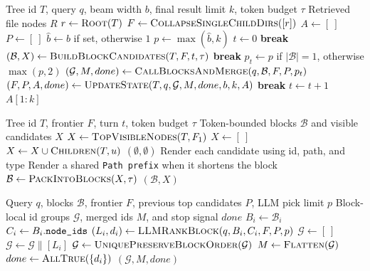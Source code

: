 \documentclass{article}
\begin{document}
\begin{algorithm}[H]
\caption{FilesystemBlock Main Loop}
\begin{algorithmic}[1]
\Require Tree id $T$, query $q$, beam width $b$, final result limit $k$, token budget $\tau$
\Ensure Retrieved file nodes $R$
\State $r \gets \Call{Root}{T}$
\State $F \gets \Call{CollapseSingleChildDirs}{[r]}$
\State $A \gets [\ ]$
\State $P \gets [\ ]$
\State $\hat b \gets b$ if set, otherwise $1$
\State $p \gets \max(\hat b,k)$ 
\State $t \gets 0$
    \State \textbf{break}
  \EndIf
  \State $(\mathcal{B}, X) \gets \Call{BuildBlockCandidates}{T,F,t,\tau}$
    \State \textbf{break}
  \EndIf
  \State $p_t \gets p$ if $|\mathcal{B}|=1$, otherwise $\max(p,2)$
  \State $(\mathcal{G}, M, done) \gets \Call{CallBlocksAndMerge}{q,\mathcal{B},F,P,p_t}$
  \State $(F,P,A,done) \gets \Call{UpdateState}{T,q,\mathcal{G},M,done,b,k,A}$
    \State \textbf{break}
  \EndIf
  \State $t \gets t + 1$
\EndWhile
\State \Return $A[1:k]$
\end{algorithmic}
\end{algorithm}

\begin{algorithm}[H]
\caption{BuildBlockCandidates}
\begin{algorithmic}[1]
\Require Tree id $T$, frontier $F$, turn $t$, token budget $\tau$
\Ensure Token-bounded blocks $\mathcal{B}$ and visible candidates $X$
  \State $X \gets \Call{TopVisibleNodes}{T,F_1}$
\Else
  \State $X \gets [\ ]$
    \State $X \gets X \cup \Call{Children}{T,u}$
  \EndFor
\EndIf
{}
  \State \Return $(\emptyset,\emptyset)$
\EndIf
\State Render each candidate using id, path, and type
\State Render a shared \texttt{Path prefix} when it shortens the block
\State $\mathcal{B} \gets \Call{PackIntoBlocks}{X,\tau}$
\State \Return $(\mathcal{B},X)$
\end{algorithmic}
\end{algorithm}

\begin{algorithm}[H]
\caption{CallBlocksAndMerge}
\begin{algorithmic}[1]
\Require Query $q$, blocks $\mathcal{B}$, frontier $F$, previous top candidates $P$, LLM pick limit $p$
\Ensure Block-local id groups $\mathcal{G}$, merged ids $M$, and stop signal $done$
  \State $B_i \gets \mathcal{B}_i$
  \State $C_i \gets B_i.\text{\texttt{node\_ids}}$
  \State $(L_i,d_i) \gets \Call{LLMRankBlock}{q,B_i,C_i,F,P,p}$
\EndFor
\State $\mathcal{G} \gets [\ ]$
  \State $\mathcal{G} \gets \mathcal{G} \parallel [L_i]$
\EndFor
\State $\mathcal{G} \gets \Call{UniquePreserveBlockOrder}{\mathcal{G}}$
\State $M \gets \Call{Flatten}{\mathcal{G}}$
\State $done \gets \Call{AllTrue}{\{d_i\}}$
\State \Return $(\mathcal{G},M,done)$
\end{algorithmic}
\end{algorithm}
\end{document}

